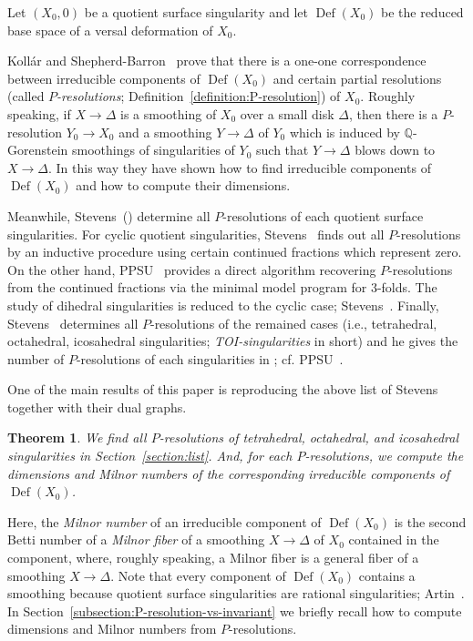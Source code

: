 \documentclass[reqno, twoside, a4paper]{amsart}
\newtheorem{theorem}{Theorem}[section]
\theoremstyle{definition}
\numberwithin{equation}{section}
\DeclareMathOperator{\Def}{Def}
\begin{document}
Let $(X_0,0)$ be a quotient surface singularity and let $\Def(X_0)$ be the reduced base space of a versal deformation of $X_0$.

Koll\'{a}r and Shepherd-Barron~\cite{KSB-1988} prove that there is a one-one correspondence between irreducible components of $\Def(X_0)$ and certain partial resolutions (called \emph{$P$-resolutions}; Definition~\ref{definition:P-resolution}) of $X_0$. Roughly speaking, if $X \to \Delta$ is a smoothing of $X_0$ over a small disk $\Delta$, then there is a $P$-resolution $Y_0 \to X_0$ and a smoothing $Y \to \Delta$ of $Y_0$ which is induced by $\mathbb{Q}$-Gorenstein smoothings of singularities of $Y_0$ such that $Y \to \Delta$ blows down to $X \to \Delta$. In this way they have shown how to find irreducible components of $\Def(X_0)$ and how to compute their dimensions.

Meanwhile, Stevens~(\cite{Stevens-1991, Stevens-1993}) determine all $P$-resolutions of each quotient surface singularities. For cyclic quotient singularities, Stevens~\cite{Stevens-1991} finds out all $P$-resolutions by an inductive procedure using certain continued fractions which represent zero. On the other hand, PPSU~\cite[p.45]{PPSU-2015} provides a direct algorithm recovering $P$-resolutions from the continued fractions via the minimal model program for 3-folds. The study of dihedral singularities is reduced to the cyclic case; Stevens~\cite[\S7]{Stevens-1991}. Finally, Stevens~\cite{Stevens-1993} determines all $P$-resolutions of the remained cases (i.e., tetrahedral, octahedral, icosahedral singularities; \emph{TOI-singularities} in short) and he gives the number of $P$-resolutions of each singularities in \cite[Table~1]{Stevens-1993}; cf. PPSU~\cite[Remark~6.11]{PPSU-2015}.

One of the main results of this paper is reproducing the above list of Stevens~\cite[Table~1]{Stevens-1993} together with their dual graphs.

\begin{theorem}\label{theorem:list}
We find all $P$-resolutions of tetrahedral, octahedral, and icosahedral singularities in Section~\ref{section:list}. And, for each $P$-resolutions, we compute the dimensions and Milnor numbers of the corresponding irreducible components of $\Def(X_0)$.
\end{theorem}

Here, the \emph{Milnor number} of an irreducible component of $\Def(X_0)$ is the second Betti number of a \emph{Milnor fiber} of a smoothing $X \to \Delta$ of $X_0$ contained in the component, where, roughly speaking, a Milnor fiber is a general fiber of a smoothing $X \to \Delta$. Note that every component of $\Def(X_0)$ contains a smoothing because quotient surface singularities are rational singularities; Artin~\cite{Artin-1974}. In Section~\ref{subsection:P-resolution-vs-invariant} we briefly recall how to compute dimensions and Milnor numbers from $P$-resolutions.
\end{document}
